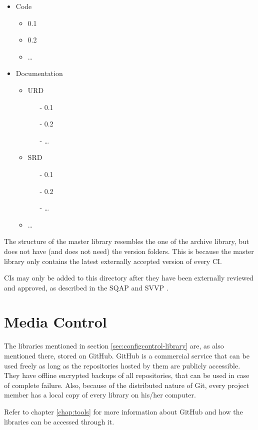 \begin{itemize}
	\item Code
	\begin{itemize}
		\item 0.1
		\item 0.2
		\item \dots
	\end{itemize}
	\item Documentation
	\begin{itemize}
		\item URD
		\begin{itemize}
			\item[-] 0.1
			\item[-] 0.2
			\item[-] \dots
		\end{itemize}
		\item SRD
		\begin{itemize}
			\item[-] 0.1
			\item[-] 0.2
			\item[-] \dots
		\end{itemize}
		\item \dots
	\end{itemize}
\end{itemize}

The structure of the master library resembles the one of the archive library, but does not have (and does not need) the version folders. This is because the master library only contains the latest externally accepted version of every CI.

CIs may only be added to this directory after they have been externally reviewed and approved, as described in the SQAP \cite{sqap} and SVVP \cite{svvp}.

\section{Media Control}
\label{sec:configcontrol-media}
The libraries mentioned in section \ref{sec:configcontrol-library} are, as also mentioned there, stored on GitHub. GitHub is a commercial service that can be used freely as long as the repositories hosted by them are publicly accessible. They have offline encrypted backups of all repositories, that can be used in case of complete failure. Also, because of the distributed nature of Git, every project member has a local copy of every library on his/her computer.

Refer to chapter \ref{chap:tools} for more information about GitHub and how the libraries can be accessed through it.

